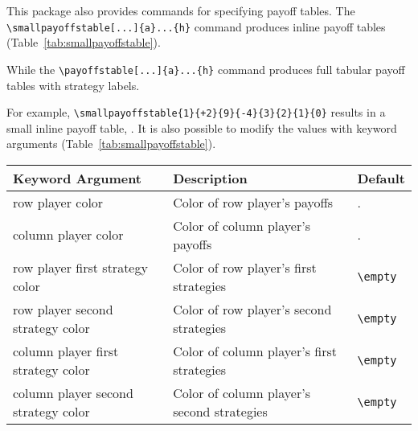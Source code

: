 \documentclass[10pt]{article}
\begin{document}
This package also provides commands for specifying payoff tables. The  \verb!\smallpayoffstable[...]{a}...{h}! command produces inline payoff tables (Table~\ref{tab:smallpayoffstable}).

While the \verb!\payoffstable[...]{a}...{h}! command produces full tabular payoff tables with strategy labels.


For example, \verb!\smallpayoffstable{1}{+2}{9}{-4}{3}{2}{1}{0}! results in a small inline payoff table, . It is also possible to modify the values with keyword arguments (Table~\ref{tab:smallpayoffstable}).

\begin{table}[t!]
    \centering
    \footnotesize
    \begin{tabular}{lll}
        Keyword Argument & Description & Default \\ \hline
        row player color & Color of row player's payoffs & . \\
        column player color & Color of column player's payoffs & . \\
        row player first strategy color & Color of row player's first strategies & \verb!\empty! \\
        row player second strategy color & Color of row player's second strategies & \verb!\empty! \\
        column player first strategy color & Color of column player's first strategies & \verb!\empty! \\
        column player second strategy color & Color of column player's second strategies & \verb!\empty! \\
    \end{tabular}

    \vspace{1.0em}


\end{table}
\end{document}

